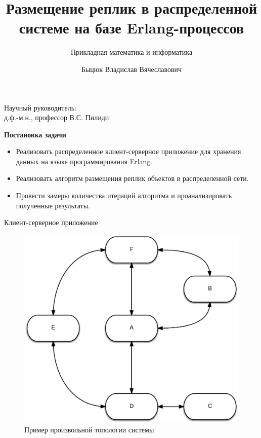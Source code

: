 \documentclass{beamer}
\title[]{Размещение реплик в распределенной\\системе на базе Erlang-процессов}
\subtitle[ПМИ]{Прикладная математика и информатика}
\author[Быцюк В.В.]{Быцюк Владислав Вячеславович}
\date[]{}
\begin{document}

\begin{frame}
	\titlepage
	\begin{center}
		Научный руководитель:\\д.ф.-м.н., профессор В.С. Пилиди
	\end{center}
\end{frame}

\begin{frame}{\LARGE \textbf{Постановка задачи}}
	\begin{itemize}
		\item Реализовать распределенное клиент-серверное приложение для хранения данных на языке программирования Erlang. 
    	\item Реализовать алгоритм размещения реплик объектов в распределенной сети. 
    	\item Провести замеры количества итераций алгоритма и проанализировать полученные результаты.
	\end{itemize}
\end{frame}
	
	

\begin{frame}[fragile]{Клиент-серверное приложение}
	\begin{figure}
		\includegraphics[scale=0.18]{img/example.png}
		\caption{Пример произвольной топологии системы}
	\end{figure}
\end{frame}
	
\end{document}

